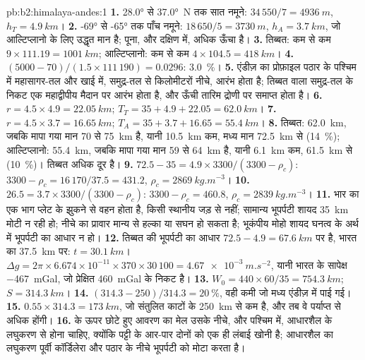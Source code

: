\begin{solution}{pb:b2:himalaya-andes:1}
\textbf{1.} \ang{28.0} से \ang{37.0}~N तक सात नमूने: $34\,550/7 = \qty{4936}{m}$, $h_T
= \qty{4.9}{km}$।
\textbf{2.} \ang{-69} से \ang{-65} तक पाँच नमूने: $18\,650/5 = \qty{3730}{m}$, $h_A =
\qty{3.7}{km}$, जो आल्टिप्लानो के लिए उद्धृत मान है; पूना, और दक्षिण में, अधिक ऊँचा है।
\textbf{3.} तिब्बत: कम से कम $9\times111.19 = \qty{1001}{km}$; आल्टिप्लानो: कम से कम $4\times
104.5 = \qty{418}{km}$।
\textbf{4.} $(5000 - 70)/(1.5\times111\,190) = 0.0296$: \qty{3.0}{\percent}।
\textbf{5.} एंडीज़ का प्रोफ़ाइल पठार के पश्चिम में महासागर-तल और खाई में, समुद्र-तल से
किलोमीटरों नीचे, आरंभ होता है; तिब्बत वाला समुद्र-तल के निकट एक महाद्वीपीय मैदान पर आरंभ होता है,
और ऊँची तारिम द्रोणी पर समाप्त होता है।
\textbf{6.} $r = 4.5\times4.9 = \qty{22.05}{km}$; $T_T = 35 + 4.9 + 22.05 = \qty{62.0}{km}$।
\textbf{7.} $r = 4.5\times3.7 = \qty{16.65}{km}$; $T_A = 35 + 3.7 + 16.65 = \qty{55.4}{km}$।
\textbf{8.} तिब्बत: \qty{62.0}{km}, जबकि मापा गया मान 70 से \qty{75}{km} है, यानी \qty{10.5}{km} कम, मध्य
मान \qty{72.5}{km} से (\qty{14}{\percent}); आल्टिप्लानो: \qty{55.4}{km}, जबकि मापा गया मान 59 से
\qty{64}{km} है, यानी \qty{6.1}{km} कम, \qty{61.5}{km} से (\qty{10}{\percent})। तिब्बत अधिक दूर है।
\textbf{9.} $72.5 - 35 = 4.9\times3300/(3300 - \rho_c)$: $3300 - \rho_c = 16\,170/37.5 =
431.2$, $\rho_c = \qty{2869}{kg.m^{-3}}$।
\textbf{10.} $26.5 = 3.7\times3300/(3300 - \rho_c)$: $3300 - \rho_c = 460.8$, $\rho_c =
\qty{2839}{kg.m^{-3}}$।
\textbf{11.} भार का एक भाग प्लेट के झुकने से वहन होता है, किसी स्थानीय जड़ से नहीं;
सामान्य भूपर्पटी शायद \qty{35}{km} मोटी न रही हो; नीचे का प्रावार मान्य से हल्का या सघन
हो सकता है; भूकंपीय मोहो शायद घनत्व के अर्थ में भूपर्पटी का आधार न हो।
\textbf{12.} तिब्बत की भूपर्पटी का आधार $72.5 - 4.9 = \qty{67.6}{km}$ पर है, भारत का
\qty{37.5}{km} पर: $t = \qty{30.1}{km}$। $\Delta g = 2\pi\times6.674\times10^{-11}\times370\times
30\,100 = \qty{4.67e-3}{m.s^{-2}}$, यानी भारत के सापेक्ष \qty{-467}{mGal}, जो
प्रेक्षित \qty{460}{mGal} के निकट है।
\textbf{13.} $W_0 = 440\times60/35 = \qty{754.3}{km}$; $S = \qty{314.3}{km}$।
\textbf{14.} $(314.3 - 250)/314.3 = \qty{20}{\percent}$, वही कमी जो मध्य
एंडीज़ में पाई गई।
\textbf{15.} $0.55\times314.3 = \qty{173}{km}$, जो संतुलित काटों के \qty{250}{km} से कम है,
और तब वे पर्याप्त से अधिक होंगी।
\textbf{16.}  के ऊपर छोटे हुए आवरण का मेल उसके नीचे, और पश्चिम में, आधारशैल के लघुकरण से
होना चाहिए, क्योंकि पट्टी के आर-पार दोनों को एक ही लंबाई खोनी है; आधारशैल का
लघुकरण पूर्वी कॉर्डिलेरा और पठार के नीचे भूपर्पटी को मोटा करता है।

\end{solution}
